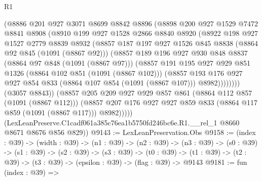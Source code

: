 \begin{lexlean}{R1}
\begin{coremodule}
              (@8886
                @201
                @927
                @3071
                @8699
                @8842
                @8896
                (@8898
                  @200
                  @927
                  @1529
                  @7472
                  @8841
                  @8908
                  (@8910
                    @199
                    @927
                    @1528
                    @2866
                    @8840
                    @8920
                    (@8922
                      @198
                      @927
                      @1527
                      @2779
                      @8839
                      @8932
                      (@8857
                        @187
                        @197
                        @927
                        @1526
                        @845
                        @8838
                        (@8864 @92 @845 (@1091 (@8867 @92)))
                        (@8857
                          @189
                          @196
                          @927
                          @930
                          @848
                          @8837
                          (@8864 @97 @848 (@1091 (@8867 @97)))
                          (@8857
                            @191
                            @195
                            @927
                            @929
                            @851
                            @1326
                            (@8864 @102 @851 (@1091 (@8867 @102)))
                            (@8857
                              @193
                              @176
                              @927
                              @927
                              @854
                              @833
                              (@8864 @107 @854 (@1091 (@8867 @107)))
                              @8982))))))))
              (@3057 @8843))
            (@8857
              @205
              @209
              @927
              @929
              @857
              @861
              (@8864 @112 @857 (@1091 (@8867 @112)))
              (@8857 @207 @176 @927 @927 @859 @833 (@8864 @117 @859 (@1091 (@8867 @117))) @8982)))))
      (LexLeanPreserve.C1cadf061a385c76ea1b5750fd246bc6e.R1.__rel_1 @8660 @8671 @8676 @856 @829))
@9143 := LexLeanPreservation.Obs
@9158 := (index : @39) ->
  (width : @39) ->
  (n1 : @39) ->
  (n2 : @39) ->
  (n3 : @39) ->
  (s0 : @39) ->
  (s1 : @39) ->
  (s2 : @39) ->
  (s3 : @39) ->
  (t0 : @39) -> (t1 : @39) -> (t2 : @39) -> (t3 : @39) -> (epsilon : @39) -> (flag : @39) -> @9143
@9181 := fun (index : @39) =>

\end{coremodule}
\end{lexlean}
